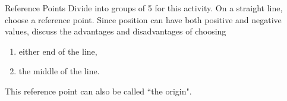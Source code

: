 \label{m38787*secfhsst!!!underscore!!!id127}
\begin{groupdiscussion}{Reference Points }
            \nopagebreak
        \label{m38787*id62809}Divide into groups of 5 for this activity.
On a straight line, choose a reference point. Since position can have both positive and negative values, discuss the advantages and disadvantages of choosing\par 
        \label{m38787*id62816}\begin{enumerate}[noitemsep, label=\textbf{\arabic*}. ] 
            \label{m38787*uid9}\item either end of the line,
\label{m38787*uid10}\item the middle of the line.
\end{enumerate}
\end{groupdiscussion}
        \label{m38787*id62843}This reference point can also be called ``the origin". \par 
\label{m38787*secfhsst!!!underscore!!!id138}
